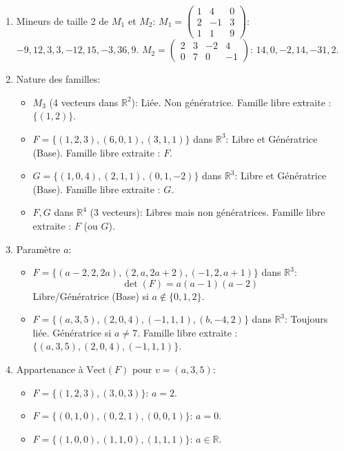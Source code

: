 \documentclass[french]{yLectureNote}
\begin{document}
\begin{enumerate}
    \item[(a)] Mineurs de taille 2 de $M_1$ et $M_2$:
    $M_{1}=\begin{pmatrix}1&4&0\\ 2&-1&3\\ 1&1&9\end{pmatrix}$: $-9, 12, 3, 3, -12, 15, -3, 36, 9$.
    $M_{2}=\begin{pmatrix}2&3&-2&4\\ 0&7&0&-1\end{pmatrix}$: $14, 0, -2, 14, -31, 2$.

    \item[(b)] Nature des familles:
    \begin{itemize}
        \item $M_{3}$ (4 vecteurs dans $\mathbb{R}^2$): Liée. Non génératrice. Famille libre extraite : $\{(1,2)\}$.
        \item $F = \{(1,2,3), (6,0,1), (3, 1, 1)\}$ dans $\mathbb{R}^{3}$: Libre et Génératrice (Base). Famille libre extraite : $F$.
        \item $G=\{(1,0,4),(2,1,1),(0,1,-2)\}$ dans $\mathbb{R}^{3}$: Libre et Génératrice (Base). Famille libre extraite : $G$.
        \item $F, G$ dans $\mathbb{R}^{4}$ (3 vecteurs): Libres mais non génératrices. Famille libre extraite : $F$ (ou $G$).
    \end{itemize}

    \item[(c)] Paramètre $a$:
    \begin{itemize}
        \item $F=\{(a-2,2,2a),(2,a,2a+2),(-1,2,a+1)\}$ dans $\mathbb{R}^{3}$:
        $$\det(F) = a(a-1)(a-2)$$
        Libre/Génératrice (Base) si $a \notin \{0, 1, 2\}$.
        \item $F = \{(a, 3, 5), (2, 0, 4), (-1, 1, 1), (b, -4, 2)\}$ dans $\mathbb{R}^{3}$:
        Toujours liée. Génératrice si $a \neq 7$. Famille libre extraite : $\{(a, 3, 5), (2, 0, 4), (-1, 1, 1)\}$.
    \end{itemize}

    \item[(d)] Appartenance à $\text{Vect}(F)$ pour $v=(a, 3, 5)$:
    \begin{itemize}
        \item $F=\{(1,2,3),(3,0,3)\}$: $a = 2$.
        \item $F = \{(0,1,0), (0, 2, 1), (0, 0, 1)\}$: $a = 0$.
        \item $F=\{(1,0,0),(1,1,0),(1,1,1)\}$: $a \in \mathbb{R}$.
    \end{itemize}
\end{enumerate}
\end{document}
